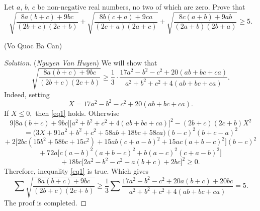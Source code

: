 \documentclass[12pt,a4paper]{book}
\begin{document}
\begin{pro}
Let $a,\,b,\,c$ be non-negative real numbers, no two of which are zero. Prove that
\[\sqrt{\frac{8a(b+c)+9bc}{(2b+c)(2c+b)}} +\sqrt{\frac{8b(c+a)+9ca}{(2c+a)(2a+c)}} +\sqrt{\frac{8c(a+b)+9ab}{(2a+b)(2b+a)}} \ge 5.\]
\begin{flushright}(Vo Quoc Ba Can)\end{flushright}
\end{pro}

\begin{proof}[\cmss\problemColor Solution] (\textit{Nguyen Van Huyen})
We will show that
\begin{equation}\label{eq1}
\sqrt{\frac{8a(b+c)+9bc}{(2b+c)(2c+b)}} \geqslant \frac{1}{3} \cdot \frac{17a^2-b^2-c^2+20(ab+bc+ca)}{a^2+b^2+c^2+4(ab+bc+ca)}.
\end{equation}
Indeed, setting 
$$X = 17a^2-b^2-c^2+20(ab+bc+ca).$$
If $X \leqslant 0,$ then \eqref{eq1} holds. Otherwise
\[9\big[8a(b+c)+9bc\big]\big[a^2+b^2+c^2+4(ab+bc+ca)\big]^2-(2b+c)(2c+b)X^2\]
\[= \big(3X+91a^2+b^2+c^2+58ab+18bc+58ca\big)(b-c)^2(b+c-a)^2\]
\[+ \ 2 \big[2bc(15b^2+58bc+15c^2) + 15ab(c+a-b)^2 + 15ac(a+b-c)^2\big](b-c)^2\]
\[+ \ 72a\big[c(a-b)^2(a+b-c)^2 + b(a-c)^2(c+a-b)^2\big]\]
\[+ \ 18bc\big[2a^2 - b^2 - c^2 - a(b+c) + 2bc\big]^2 \ge 0.\]
Therefore, inequality \eqref{eq1} is true. Which gives
\[\sum \sqrt{\frac{8a(b+c)+9bc}{(2b+c)(2c+b)}} \geqslant \frac{1}{3} \sum \frac{17a^2-b^2-c^2+20a(b+c)+20bc}{a^2+b^2+c^2+4(ab+bc+ca)} = 5.\]
The proof is completed.
\end{proof}
\end{document}
